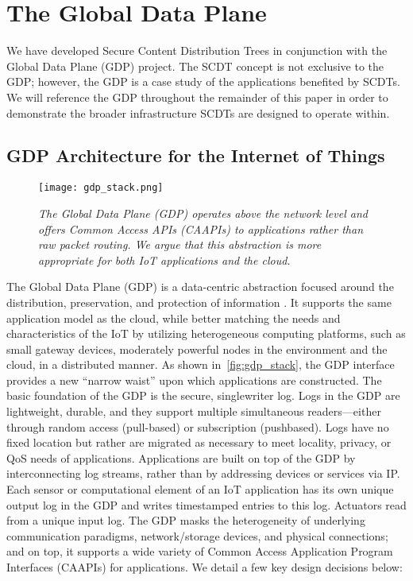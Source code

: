 \chapter{The Global Data Plane}
We have developed Secure Content Distribution Trees in conjunction with the Global Data Plane (GDP) project. The SCDT concept is not exclusive to the GDP; however, the GDP is a case study of the applications benefited by SCDTs. We will reference the GDP throughout the remainder of this paper in order to demonstrate the broader  infrastructure SCDTs are designed to operate within.

\section{GDP Architecture for the Internet of Things}
\label{gdp-arch}
\begin{figure}[t]
	\begin{center}
		\texttt{[image: gdp\_stack.png]}
	\end{center}
	\vspace{-1.3em}
	\caption{\small \itshape  The Global Data Plane (GDP) operates above the network level and offers Common Access APIs (CAAPIs) to applications rather than raw packet routing. We argue that this abstraction is more appropriate for both IoT applications and the cloud.}
	\vspace{-1em}
	\label{fig:gdp_stack}
\end{figure}

The Global Data Plane (GDP) is a data-centric abstraction
focused around the distribution, preservation, and
protection of information \cite{kubi}. It supports the same application
model as the cloud, while better matching the needs
and characteristics of the IoT by utilizing heterogeneous
computing platforms, such as small gateway devices, moderately
powerful nodes in the environment and the cloud,
in a distributed manner.
As shown in~\autoref{fig:gdp_stack}, the GDP interface provides a new
“narrow waist” upon which applications are constructed.
The basic foundation of the GDP is the secure, singlewriter
log. Logs in the GDP are lightweight, durable,
and they support multiple simultaneous readers—either
through random access (pull-based) or subscription (pushbased).
Logs have no fixed location but rather are migrated
as necessary to meet locality, privacy, or QoS needs
of applications.
Applications are built on top of the GDP by interconnecting
log streams, rather than by addressing devices or
services via IP. Each sensor or computational element of
an IoT application has its own unique output log in the
GDP and writes timestamped entries to this log. Actuators
read from a unique input log. The GDP masks the
heterogeneity of underlying communication paradigms,
network/storage devices, and physical connections; and
on top, it supports a wide variety of Common Access Application
Program Interfaces (CAAPIs) for applications.
We detail a few key design decisions below:

